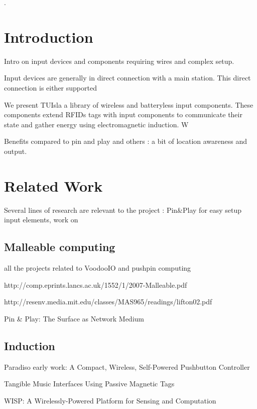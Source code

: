 \documentclass{ubicomp2013}
\begin{document}

.


\section{Introduction}
Intro on input devices and components requiring wires and complex setup.

Input devices are generally in direct connection with a main station. This direct connection is either supported 

We present TUIsla a library of wireless and batteryless input components. These components extend RFIDs tags with input components to communicate their state and gather energy using electromagnetic induction.
W

Benefits compared to pin and play and others : a bit of location awareness and output.
 
\section{Related Work}
Several lines of research are relevant to the project : Pin\&Play for easy setup input elements, work on 

\subsection{Malleable computing}
all the projects related to VoodooIO and pushpin computing

http://comp.eprints.lancs.ac.uk/1552/1/2007-Malleable.pdf

http://resenv.media.mit.edu/classes/MAS965/readings/lifton02.pdf

Pin \& Play: The Surface as Network Medium

\subsection{Induction}
Paradiso early work: 
A Compact, Wireless, Self-Powered Pushbutton Controller

Tangible Music Interfaces Using Passive Magnetic Tags


WISP: A Wirelessly-Powered Platform for Sensing and Computation
\end{document}
